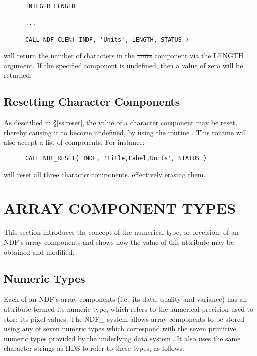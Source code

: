 \small
\begin{verbatim}
      INTEGER LENGTH

      ...

      CALL NDF_CLEN( INDF, 'Units', LENGTH, STATUS )
\end{verbatim}
\normalsize

will return the number of characters in the \st{units\/} component via the
LENGTH argument. 
If the specified component is undefined, then a value of zero will be 
returned.

\subsection{Resetting Character Components}

As described in \S\ref{ss:reset}, the value of a character component may be
reset, thereby causing it to become undefined, by using the routine .
This routine will also accept a list of components.
For instance:

\small
\begin{verbatim}
      CALL NDF_RESET( INDF, 'Title,Label,Units', STATUS )
\end{verbatim}
\normalsize

will reset all three character components, effectively erasing them.


\section{ARRAY COMPONENT TYPES}

This section introduces the concept of the numerical \st{type}, or
precision, of an NDF's array components and shows how the value of
this attribute may be obtained and modified.

\subsection{\label{ss:numerictypes}Numeric Types}

Each of an NDF's array components (\st{i.e.}\ its \st{data},
\st{quality\/} and \st{variance\/}) has an attribute termed its \st{numeric 
type}, which refers to the numerical precision used to store its pixel
values. 
The NDF\_ system allows array components to be stored using any of seven
numeric types which correspond with the seven primitive numeric types
provided by the underlying data system . 
It also uses the same character strings as HDS to refer to these
types, as follows:

